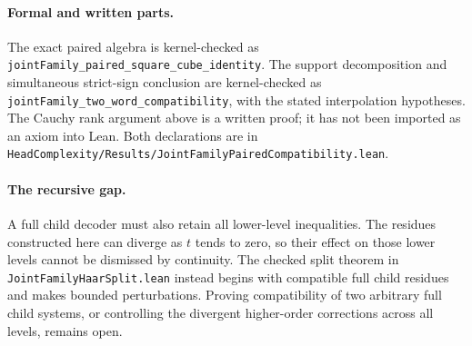 \paragraph{Formal and written parts.}
The exact paired algebra is kernel-checked as
\texttt{jointFamily\_paired\_square\_cube\_identity}.
The support decomposition and simultaneous strict-sign conclusion are
kernel-checked as \texttt{jointFamily\_two\_word\_compatibility},
with the stated interpolation hypotheses.  The Cauchy rank argument
above is a written proof; it has not been imported as an axiom into
Lean.  Both declarations are in
\texttt{HeadComplexity/Results/JointFamilyPairedCompatibility.lean}.

\paragraph{The recursive gap.}
A full child decoder must also retain all lower-level inequalities.
The residues constructed here can diverge as $t$ tends to zero, so
their effect on those lower levels cannot be dismissed by continuity.
The checked split theorem in \texttt{JointFamilyHaarSplit.lean}
instead begins with compatible full child residues and makes bounded
perturbations.  Proving compatibility of two arbitrary full child
systems, or controlling the divergent higher-order corrections across
all levels, remains open.
